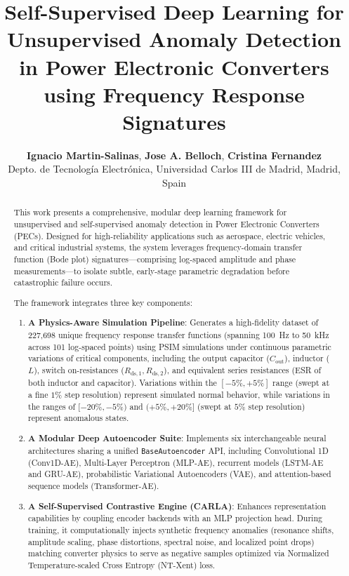 \documentclass[11pt,a4paper]{article}
\title{\textbf{Self-Supervised Deep Learning for Unsupervised Anomaly Detection in Power Electronic Converters using Frequency Response Signatures}}
\author{
    \textbf{Ignacio Martin-Salinas}, \textbf{Jose A. Belloch}, \textbf{Cristina Fernandez} \\
    \small Depto. de Tecnología Electrónica, Universidad Carlos III de Madrid, Madrid, Spain
}
\date{}
\begin{document}
\maketitle

\begin{abstract}
This work presents a comprehensive, modular deep learning framework for unsupervised and self-supervised anomaly detection in Power Electronic Converters (PECs). Designed for high-reliability applications such as aerospace, electric vehicles, and critical industrial systems, the system leverages frequency-domain transfer function (Bode plot) signatures---comprising log-spaced amplitude and phase measurements---to isolate subtle, early-stage parametric degradation before catastrophic failure occurs.

The framework integrates three key components:
\begin{enumerate}
    \item \textbf{A Physics-Aware Simulation Pipeline}: Generates a high-fidelity dataset of 227,698 unique frequency response transfer functions (spanning 100~Hz to 50~kHz across 101 log-spaced points) using PSIM simulations under continuous parametric variations of critical components, including the output capacitor ($C_{\text{out}}$), inductor ($L$), switch on-resistances ($R_{\text{ds},1}, R_{\text{ds},2}$), and equivalent series resistances (ESR of both inductor and capacitor). Variations within the $[-5\%, +5\%]$ range (swept at a fine $1\%$ step resolution) represent simulated normal behavior, while variations in the ranges of $[-20\%, -5\%)$ and $(+5\%, +20\%]$ (swept at $5\%$ step resolution) represent anomalous states.
    \item \textbf{A Modular Deep Autoencoder Suite}: Implements six interchangeable neural architectures sharing a unified \texttt{BaseAutoencoder} API, including Convolutional 1D (Conv1D-AE), Multi-Layer Perceptron (MLP-AE), recurrent models (LSTM-AE and GRU-AE), probabilistic Variational Autoencoders (VAE), and attention-based sequence models (Transformer-AE).
    \item \textbf{A Self-Supervised Contrastive Engine (CARLA)}: Enhances representation capabilities by coupling encoder backends with an MLP projection head. During training, it computationally injects synthetic frequency anomalies (resonance shifts, amplitude scaling, phase distortions, spectral noise, and localized point drops) matching converter physics to serve as negative samples optimized via Normalized Temperature-scaled Cross Entropy (NT-Xent) loss.
\end{enumerate}


\end{abstract}
\end{document}
